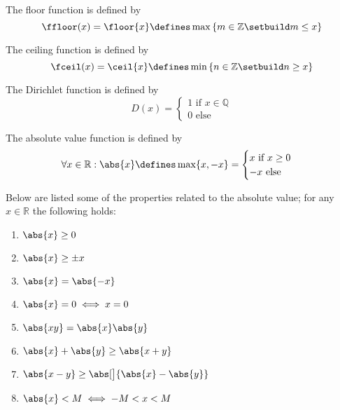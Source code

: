 \begin{definition}\label{def-floor-function}
	The floor function is defined by
	\begin{equation}
		\ffloor(x)=\floor{x}\defines\max\left\{m\in\mathbb{Z}\setbuild m\leq x\right\}
	\end{equation}
\end{definition}

\begin{definition}\label{def-ceiling-function}
	The ceiling function is defined by
	\begin{equation}
		\fceil(x)=\ceil{x}\defines\min\left\{n\in\mathbb{Z}\setbuild n\geq x\right\}
	\end{equation}
\end{definition}

\begin{definition}\label{def-dirichlet-function}
	The Dirichlet function is defined by
	\begin{equation}
		D(x)=\begin{cases}
			1\text{ if }x\in\mathbb{Q} \\
			0\text{ else }
		\end{cases}
	\end{equation}
\end{definition}

\begin{definition}\label{def-absolute-value-function}
	The absolute value function is defined by
	\begin{equation}
		\forall x\in\mathbb{R}: \abs{x}\defines\max\{x,-x\}=\begin{cases}
			x\text{ if } x \geq 0 \\
			-x \text{ else }
		\end{cases}
	\end{equation}
\end{definition}

\begin{thm}\label{thm-absolute-value-properties}
	Below are listed some of the properties related to the absolute value; for
	any $x\in\mathbb{R}$ the following holds:
	\begin{enumerate}
		\item $\abs{x} \geq 0$
		\item $\abs{x} \geq \pm x$
		\item $\abs{x} = \abs{-x}$
		\item $\abs{x} = 0 \iff x = 0$
		\item $\abs{xy} = \abs{x}\abs{y}$
		\item $\abs{x} + \abs{y} \geq \abs{x+y}$
		\item $\abs{x-y} \geq \abs[\big]{\abs{x}-\abs{y}}$
		\item $\abs{x} < M \iff -M < x < M$
	\end{enumerate}
\end{thm}

